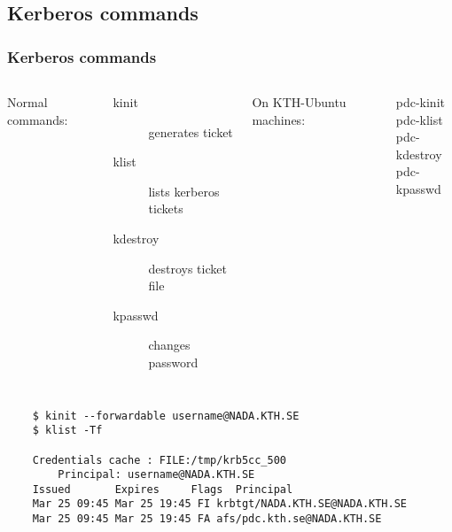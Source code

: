 \subsection*{Kerberos commands}

\begin{frame}[fragile]
\frametitle{Kerberos commands}

\begin{columns}[t]
\alert{Normal commands:}
\begin{description}
 \item [kinit] generates ticket
 \item [klist] lists kerberos tickets
 \item [kdestroy] destroys ticket file
 \item [kpasswd] changes password
\end{description}

\alert{On KTH-Ubuntu machines:}
\begin{description}
 \item [pdc-kinit] 
 \item [pdc-klist] 
 \item [pdc-kdestroy]
 \item [pdc-kpasswd] 
\end{description}
\end{columns}

\scriptsize
\begin{block}{}
  \begin{verbatim}
    $ kinit --forwardable username@NADA.KTH.SE
    $ klist -Tf
    
    Credentials cache : FILE:/tmp/krb5cc_500
        Principal: username@NADA.KTH.SE
    Issued       Expires     Flags  Principal
    Mar 25 09:45 Mar 25 19:45 FI krbtgt/NADA.KTH.SE@NADA.KTH.SE
    Mar 25 09:45 Mar 25 19:45 FA afs/pdc.kth.se@NADA.KTH.SE
\end{verbatim}
\end{block}
\end{frame}


